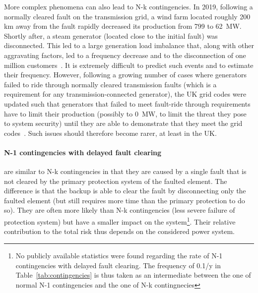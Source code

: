More complex phenomena can also lead to N-k contingencies. In 2019, following a normally cleared fault on the transmission grid, a wind farm located roughly 200 km away from the fault rapidly decreased its production from 799 to 62~MW. Shortly after, a steam generator (located close to the initial fault) was disconnected. This led to a large generation load imbalance that, along with other aggravating factors, led to a frequency decrease and to the disconnection of one million customers~\cite{2019UKBlackout}. It is extremely difficult to predict such events and to estimate their frequency. However, following a growing number of cases where generators failed to ride through normally cleared transmission faults (which is a requirement for any transmission-connected generator), the UK grid codes were updated such that generators that failed to meet fault-ride through requirements have to limit their production (possibly to 0~MW, to limit the threat they pose to system security) until they are able to demonstrate that they meet the grid codes~\cite{FaultRideThroughEnforcement}. Such issues should therefore become rarer, at least in the UK.


\paragraph*{N-1 contingencies with delayed fault clearing} are similar to N-k contingencies in that they are caused by a single fault that is not cleared by the primary protection system of the faulted element. The difference is that the backup is able to clear the fault by disconnecting only the faulted element (but still requires more time than the primary protection to do so). They are often more likely than N-k contingencies (less severe failure of protection system) but have a smaller impact on the system\footnote{No publicly available statistics were found regarding the rate of N-1 contingencies with delayed fault clearing. The frequency of 0.1/y in Table~\ref{tab:contingencies} is thus taken as an intermediate between the one of normal N-1 contingencies and the one of N-k contingnecies}. Their relative contribution to the total risk thus depends on the considered power system.


